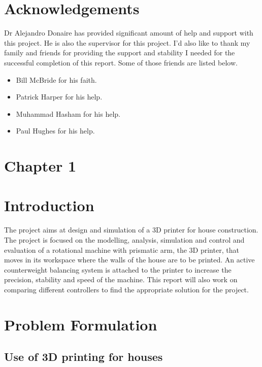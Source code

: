 \documentclass{UoNMCHA}
\numberwithin{equation}{section}
\begin{document}
\newpage
\vspace{-2mm}
\section*{Acknowledgements}

Dr Alejandro Donaire has provided significant amount of help and support with this project. He is also the supervisor for this project. I’d also like to thank my family and friends for providing the support and stability I needed for the successful completion of this report. Some of those friends are listed below.
\begin{itemize}
	\item Bill McBride for his faith.
	\item Patrick Harper for his help.
	\item Muhammad Hasham for his help.
	\item Paul Hughes for his help.
	
\end{itemize}

\newpage
\tableofcontents
\listoffigures
\listoftables
\newpage
\section*{Chapter 1}
\section{Introduction}

The project aims at design and simulation of a 3D printer for house construction. The project is focused on the modelling, analysis, simulation and control and evaluation of a rotational machine with prismatic arm, the 3D printer, that moves in its workspace where the walls of the house are to be printed. An active counterweight balancing system is attached to the printer to increase the precision, stability and speed of the machine. This report will also work on comparing different controllers to find the appropriate solution for the project.

    
\section{Problem Formulation}\label{Problem Formulation}

\subsection{Use of 3D printing for houses}\label{Use of 3D printing for houses}
    
\end{document}
